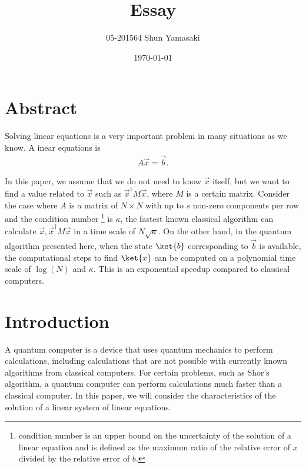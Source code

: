 \documentclass[b5paper,papersize,dvipdfmx,fleqn]{article}
\begin{document}
\title{Essay}
\author{05-201564 Shun Yamasaki}
\date{\today}
\maketitle

\section{Abstract}
Solving linear equations is a very important problem in many situations as we know\cite{Harrow2009}. A inear equations is
\begin{eqnarray}
  A\vec{x} = \vec{b}.
\end{eqnarray}

In this paper, we assume that we do not need to know $\vec{x}$ itself, but we want to find a value related to $\vec{x}$ such as $\vec{x}^\dagger M \vec{x}$, where $M$ is a certain matrix. Consider the case where $A$ is a matrix of $N\times N$ with up to $s$ non-zero components per row and the condition number \footnote{condition number is an upper bound on the uncertainty of the solution of a linear equation and is defined as the maximum ratio of the relative error of $x$ divided by the relative error of $b$.} is $\kappa $, the fastest known classical algorithm can calculate $\vec{x}, \vec{x}^\dagger M\vec{x}$ in a time scale of $N\sqrt{\kappa }$.
On the other hand, in the quantum algorithm presented here, when the state $\ket{b}$ corresponding to $\vec{b}$ is available, the computational steps to find $\ket{x}$ can be computed on a polynomial time scale of $\log(N)$ and $\kappa $. This is an exponential speedup compared to classical computers.

\section{Introduction}

A quantum computer is a device that uses quantum mechanics to perform calculations, including calculations that are not possible with currently known algorithms from classical computers. For certain problems, such as Shor's algorithm, a quantum computer can perform calculations much faster than a classical computer. In this paper, we will consider the characteristics of the solution of a linear system of linear equations.
\end{document}
